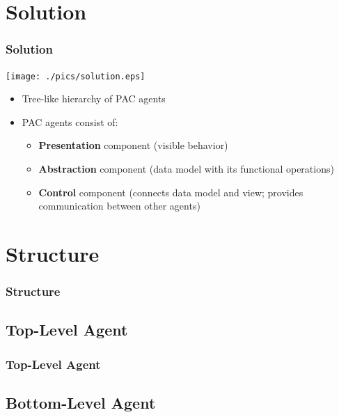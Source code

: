 \documentclass{beamer}
\begin{document}
\section{Solution}

\begin{frame}
\frametitle{Solution}

\begin{center}
 \texttt{[image: ./pics/solution.eps]}
\end{center}


 \begin{itemize}
  \item Tree-like hierarchy of PAC agents
  \item PAC agents consist of:
  \begin{itemize}
   \item \textbf{Presentation} component (visible behavior)
   \item \textbf{Abstraction} component (data model with its functional operations)
   \item \textbf{Control} component (connects data model and view; provides communication
between other agents)
  \end{itemize}
 \end{itemize}

 
\end{frame}


\section{Structure}

\begin{frame}
 \frametitle{Structure}
 
\end{frame}


\subsection{Top-Level Agent}

\begin{frame}
 \frametitle{Top-Level Agent}
 
\end{frame}

\subsection{Bottom-Level Agent}
\end{document}
